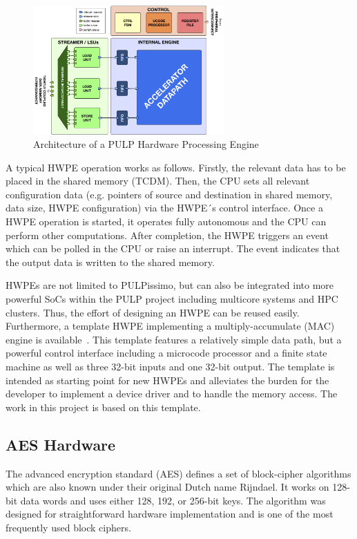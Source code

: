 \documentclass[a4paper, 12pt]{article}
\begin{document}
\begin{figure}
	\centering
	\includegraphics[width=0.65\textwidth]{hwpe.png}
	\caption{Architecture of a PULP Hardware Processing Engine \cite{hwpe}}
	\label{hwpe-arch}
\end{figure}

A typical HWPE operation works as follows. Firstly, the relevant data has to be placed in the shared memory (TCDM). Then, the CPU sets all relevant configuration data (e.g. pointers of source and destination in shared memory, data size, HWPE configuration) via the HWPE´s control interface. Once a HWPE operation is started, it operates fully autonomous and the CPU can perform other computations. After completion, the HWPE triggers an event which can be polled in the CPU or raise an interrupt. The event indicates that the output data is written to the shared memory.

HWPEs are not limited to PULPissimo, but can also be integrated into more powerful SoCs within the PULP project including multicore systems and HPC clusters. Thus, the effort of designing an HWPE can be reused easily. Furthermore, a template HWPE implementing a multiply-accumulate (MAC) engine is available~\cite{hwpe-mac}. This template features a relatively simple data path, but a powerful control interface including a microcode processor and a finite state machine as well as three 32-bit inputs and one 32-bit output. The template is intended as starting point for new HWPEs and alleviates the burden for the developer to implement a device driver and to handle the memory access. The work in this project is based on this template.

\subsection{AES Hardware}

The advanced encryption standard (AES) defines a set of block-cipher algorithms which are also known under their original Dutch name Rijndael. It works on 128-bit data words and uses either 128, 192, or 256-bit keys. The algorithm was designed for straightforward hardware implementation and is one of the most frequently used block ciphers.
\end{document}
